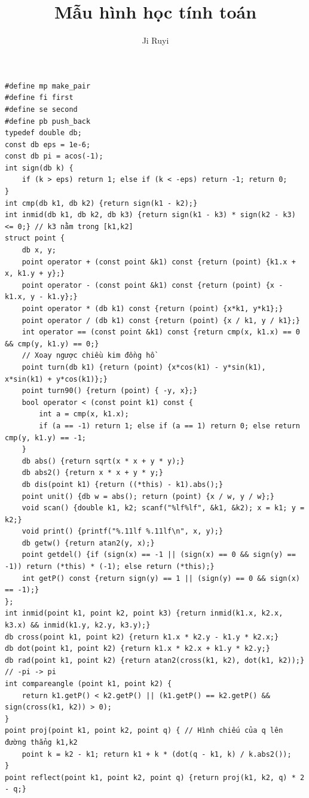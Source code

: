 \documentclass[11pt]{article}
\title{Mẫu hình học tính toán}
\author{Ji Ruyi}
\date{}
\begin{document}
\maketitle


\begingroup
\scriptsize
\begin{verbatim}
#define mp make_pair
#define fi first
#define se second
#define pb push_back
typedef double db;
const db eps = 1e-6;
const db pi = acos(-1);
int sign(db k) {
	if (k > eps) return 1; else if (k < -eps) return -1; return 0;
}
int cmp(db k1, db k2) {return sign(k1 - k2);}
int inmid(db k1, db k2, db k3) {return sign(k1 - k3) * sign(k2 - k3) <= 0;} // k3 nằm trong [k1,k2]
struct point {
	db x, y;
	point operator + (const point &k1) const {return (point) {k1.x + x, k1.y + y};}
	point operator - (const point &k1) const {return (point) {x - k1.x, y - k1.y};}
	point operator * (db k1) const {return (point) {x*k1, y*k1};}
	point operator / (db k1) const {return (point) {x / k1, y / k1};}
	int operator == (const point &k1) const {return cmp(x, k1.x) == 0 && cmp(y, k1.y) == 0;}
	// Xoay ngược chiều kim đồng hồ
	point turn(db k1) {return (point) {x*cos(k1) - y*sin(k1), x*sin(k1) + y*cos(k1)};}
	point turn90() {return (point) { -y, x};}
	bool operator < (const point k1) const {
		int a = cmp(x, k1.x);
		if (a == -1) return 1; else if (a == 1) return 0; else return cmp(y, k1.y) == -1;
	}
	db abs() {return sqrt(x * x + y * y);}
	db abs2() {return x * x + y * y;}
	db dis(point k1) {return ((*this) - k1).abs();}
	point unit() {db w = abs(); return (point) {x / w, y / w};}
	void scan() {double k1, k2; scanf("%lf%lf", &k1, &k2); x = k1; y = k2;}
	void print() {printf("%.11lf %.11lf\n", x, y);}
	db getw() {return atan2(y, x);}
	point getdel() {if (sign(x) == -1 || (sign(x) == 0 && sign(y) == -1)) return (*this) * (-1); else return (*this);}
	int getP() const {return sign(y) == 1 || (sign(y) == 0 && sign(x) == -1);}
};
int inmid(point k1, point k2, point k3) {return inmid(k1.x, k2.x, k3.x) && inmid(k1.y, k2.y, k3.y);}
db cross(point k1, point k2) {return k1.x * k2.y - k1.y * k2.x;}
db dot(point k1, point k2) {return k1.x * k2.x + k1.y * k2.y;}
db rad(point k1, point k2) {return atan2(cross(k1, k2), dot(k1, k2));}
// -pi -> pi
int compareangle (point k1, point k2) {
	return k1.getP() < k2.getP() || (k1.getP() == k2.getP() && sign(cross(k1, k2)) > 0);
}
point proj(point k1, point k2, point q) { // Hình chiếu của q lên đường thẳng k1,k2
	point k = k2 - k1; return k1 + k * (dot(q - k1, k) / k.abs2());
}
point reflect(point k1, point k2, point q) {return proj(k1, k2, q) * 2 - q;}

\end{verbatim}
\end{document}
